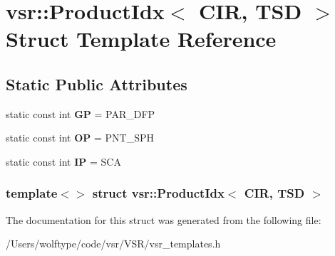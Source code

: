 \hypertarget{structvsr_1_1_product_idx_3_01_c_i_r_00_01_t_s_d_01_4}{\section{vsr\-:\-:Product\-Idx$<$ C\-I\-R, T\-S\-D $>$ Struct Template Reference}
\label{structvsr_1_1_product_idx_3_01_c_i_r_00_01_t_s_d_01_4}
}
\subsection*{Static Public Attributes}
\begin{DoxyCompactItemize}
\item 
\hypertarget{structvsr_1_1_product_idx_3_01_c_i_r_00_01_t_s_d_01_4_aea160ef0c13d19b8df8b3860196c1bfd}{static const int {\bfseries G\-P} = P\-A\-R\-\_\-\-D\-F\-P}\label{structvsr_1_1_product_idx_3_01_c_i_r_00_01_t_s_d_01_4_aea160ef0c13d19b8df8b3860196c1bfd}

\item 
\hypertarget{structvsr_1_1_product_idx_3_01_c_i_r_00_01_t_s_d_01_4_aa6b58a0fdfb748647f57e3eff5af9d01}{static const int {\bfseries O\-P} = P\-N\-T\-\_\-\-S\-P\-H}\label{structvsr_1_1_product_idx_3_01_c_i_r_00_01_t_s_d_01_4_aa6b58a0fdfb748647f57e3eff5af9d01}

\item 
\hypertarget{structvsr_1_1_product_idx_3_01_c_i_r_00_01_t_s_d_01_4_aaef31703dd5b24a551b38b706fef0419}{static const int {\bfseries I\-P} = S\-C\-A}\label{structvsr_1_1_product_idx_3_01_c_i_r_00_01_t_s_d_01_4_aaef31703dd5b24a551b38b706fef0419}

\end{DoxyCompactItemize}
\subsubsection*{template$<$$>$ struct vsr\-::\-Product\-Idx$<$ C\-I\-R, T\-S\-D $>$}



The documentation for this struct was generated from the following file\-:\begin{DoxyCompactItemize}
\item 
/\-Users/wolftype/code/vsr/\-V\-S\-R/vsr\-\_\-templates.\-h\end{DoxyCompactItemize}
